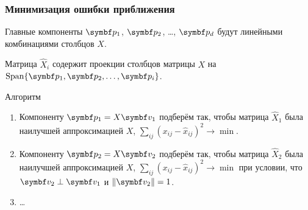 \begin{frame}
  \frametitle{Минимизация ошибки приближения}


  Главные компоненты $\bp_1$, $\bp_2$, \ldots, $\bp_d$ будут линейными 
  комбинациями столбцов $X$. \pause

  Матрица $\hat X_i$ содержит проекции столбцов матрицы $X$ на $\Span\{ \bp_1, \bp_2, \ldots, \bp_i\}$.


  \begin{block}{Алгоритм}
    \begin{enumerate}
      \item Компоненту $\bp_1 = X \bv_1$ подберём так, чтобы 
      матрица $\hat X_1$ была наилучшей аппроксимацией $X$, $\sum_{ij} (x_{ij} - \hat{x}_{ij})^2 \to\min$. \pause

\item Компоненту $\bp_2 = X \bv_2$ подберём так, чтобы 
матрица $\hat X_2$ была наилучшей аппроксимацией $X$, $\sum_{ij} (x_{ij} - \hat{x}_{ij})^2 \to\min$
 при условии, что $\bv_2 \perp \bv_1$ и $\norm{\bv_2}=1$. 
      \item \ldots
    \end{enumerate}
    
  \end{block}
  

\end{frame}


